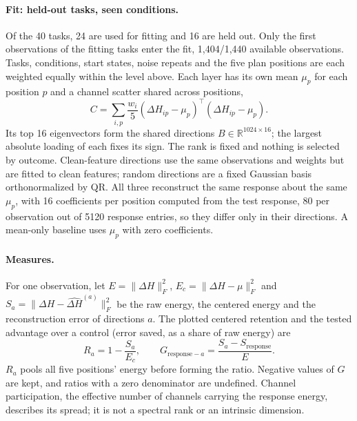 \paragraph{Fit: held-out tasks, seen conditions.}
Of the 40 tasks, 24 are used for fitting and 16 are held out. Only the first observations of the fitting tasks enter the fit, 1,404/1,440 available observations. Tasks, conditions, start states, noise repeats and the five plan positions are each weighted equally within the level above. Each layer has its own mean $\mu_p$ for each position $p$ and a channel scatter shared across positions,
\begin{equation}
C=\sum_{i,p}\frac{w_i}{5}
(\Delta H_{ip}-\mu_p)^\top(\Delta H_{ip}-\mu_p).
\end{equation}
Its top 16 eigenvectors form the shared directions $B\in\mathbb R^{1024\times16}$; the largest absolute loading of each fixes its sign. The rank is fixed and nothing is selected by outcome. Clean-feature directions use the same observations and weights but are fitted to clean features; random directions are a fixed Gaussian basis orthonormalized by QR. All three reconstruct the same response about the same $\mu_p$, with 16 coefficients per position computed from the test response, 80 per observation out of 5120 response entries, so they differ only in their directions. A mean-only baseline uses $\mu_p$ with zero coefficients.

\paragraph{Measures.}
For one observation, let $E=\|\Delta H\|_F^2$, $E_c=\|\Delta H-\mu\|_F^2$ and $S_a=\|\Delta H-\widehat{\Delta H}^{(a)}\|_F^2$ be the raw energy, the centered energy and the reconstruction error of directions $a$. The plotted centered retention and the tested advantage over a control (error saved, as a share of raw energy) are
\begin{equation}
R_a=1-\frac{S_a}{E_c},\qquad
G_{\mathrm{response}-a}=\frac{S_a-S_{\mathrm{response}}}{E}.
\end{equation}
$R_a$ pools all five positions' energy before forming the ratio. Negative values of $G$ are kept, and ratios with a zero denominator are undefined. Channel participation, the effective number of channels carrying the response energy, describes its spread; it is not a spectral rank or an intrinsic dimension.

